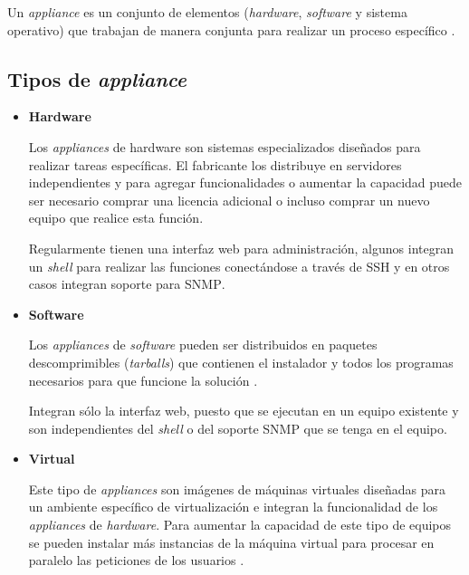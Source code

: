 Un \textit{appliance} es un conjunto de elementos (\textit{hardware}, \textit{software} y sistema operativo) que trabajan de manera conjunta para realizar un proceso espec\'{i}fico \cite{smith_linux_2007}.

    \subsection{Tipos de \textit{appliance}}

\begin{itemize}

  \item \textbf{Hardware}

Los \textit{appliances} de hardware son sistemas especializados dise\~{n}ados para realizar tareas espec\'{i}ficas. El fabricante los distribuye en servidores independientes y para agregar funcionalidades o aumentar la capacidad puede ser necesario comprar una licencia adicional o incluso comprar un nuevo equipo que realice esta funci\'{o}n.

Regularmente tienen una interfaz web para administraci\'{o}n, algunos integran un \textit{shell} para realizar las funciones conect\'{a}ndose a trav\'{e}s de \textsc{SSH} y en otros casos integran soporte para \textsc{SNMP}.

\newpage
  \item \textbf{Software}

Los \textit{appliances} de \textit{software} pueden ser distribuidos en paquetes descomprimibles (\textit{tarballs}) que contienen el instalador y todos los programas necesarios para que funcione la soluci\'{o}n \cite{_bitnami:_????}.

Integran s\'{o}lo la interfaz web, puesto que se ejecutan en un equipo existente y son independientes del \textit{shell} o del soporte \textsc{SNMP} que se tenga en el equipo.

  \item \textbf{Virtual}

Este tipo de \textit{appliances} son im\'{a}genes de m\'{a}quinas virtuales dise\~{n}adas para un ambiente espec\'{i}fico de virtualizaci\'{o}n e integran la funcionalidad de los \textit{appliances} de \textit{hardware}. Para aumentar la capacidad de este tipo de equipos se pueden instalar m\'{a}s instancias de la m\'{a}quina virtual para procesar en paralelo las peticiones de los usuarios \cite{_why_????}.

\end{itemize}

